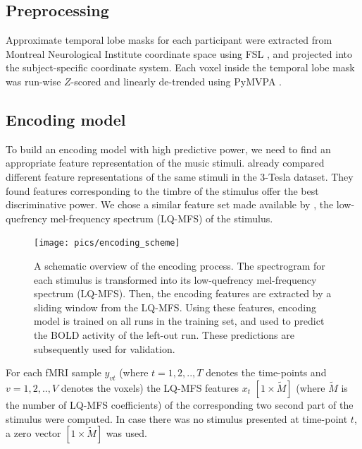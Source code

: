 \subsection*{Preprocessing}

Approximate temporal lobe masks for each participant were extracted from
Montreal Neurological Institute coordinate space using FSL
\citep{SJB+04,JBB+12}, and projected into the subject-specific coordinate
system.  Each voxel inside the temporal lobe mask was run-wise $Z$-scored and
linearly de-trended using PyMVPA \citep{HHS09b}. 

\subsection*{Encoding model}

To build an encoding model with high predictive power, we need to find an
appropriate feature representation of the music stimuli.  \citet{CTK+2012}
already compared different feature representations of the same stimuli in the
3-Tesla dataset. They found features corresponding to the timbre of the
stimulus
offer the best discriminative power.  We chose a similar feature set made
available by \citet{HDH+2015}, the low-quefrency mel-frequency spectrum
(LQ-MFS) of the stimulus.

\begin{figure}
  \centering
  \texttt{[image: pics/encoding\_scheme]}

  \caption{A schematic overview of the encoding process. The spectrogram for
    each stimulus is transformed into its low-quefrency mel-frequency spectrum
    (LQ-MFS). Then, the encoding features are extracted by a sliding window
    from the LQ-MFS. Using these features, encoding model is trained on all
    runs in the training set, and used to predict the BOLD activity of the
  left-out run.  These predictions are subsequently used for validation.}

 \label{fig:encoding_scheme}
\end{figure}


For each f{MRI} sample $y_{vt}$ (where $t=1,2,..,T$ denotes the time-points and
$v=1,2,..,V$ denotes the voxels) the LQ-MFS features $x_{t}$
$[1\times\widetilde{M}]$ (where $\widetilde{M}$ is the number of LQ-MFS
coefficients) of the corresponding two second part of the stimulus were
computed. In case there was no stimulus presented at time-point $t$, a zero
vector $[1\times\widetilde{M}]$ was used. 

